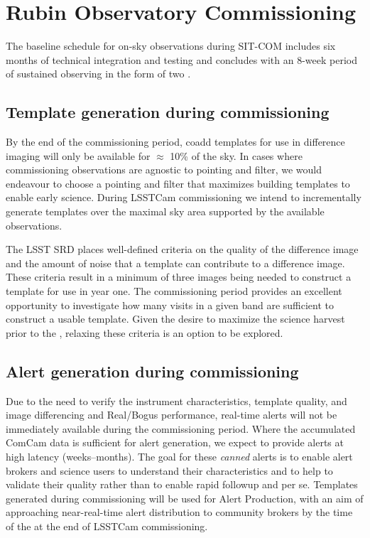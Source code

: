 \section{Rubin Observatory Commissioning} 
\label{sec:commissioning}

The baseline schedule for on-sky observations during SIT-COM includes six months of technical integration and testing and concludes with an 8-week period of sustained observing in the form of two \svs \citep{SCTN-007}. 

\subsection{Template generation during commissioning}

By the end of the commissioning period, coadd templates for use in difference imaging will only be available for $\approx$ 10\% of the sky. 
In cases where commissioning observations are agnostic to pointing and filter, we would endeavour to choose a pointing and filter that maximizes building templates to enable early science. 
During LSSTCam commissioning we intend to incrementally generate templates over the maximal sky area supported by the available observations.

The LSST SRD places well-defined criteria on the quality of the difference image and the amount of noise that a template can contribute to a difference image.  
These criteria result in a minimum of three images being needed to construct a template for use in year one.  
The commissioning period provides an excellent opportunity to investigate how many visits in a given band are sufficient to construct a usable template. 
Given the desire to maximize the science harvest prior to the \drone,  relaxing these criteria is an option to be explored. 

\subsection{Alert generation during commissioning}

Due to the need to verify the instrument characteristics, template quality, and image differencing and Real/Bogus performance, real-time alerts will not be immediately available during the commissioning period. 
Where the accumulated ComCam data is sufficient for alert generation, we expect to provide alerts at high latency (weeks--months). 
The goal for these {\it canned} alerts is to enable alert brokers and science users to understand their characteristics and to help to validate their quality rather than to enable rapid followup and \es per se.
Templates generated during commissioning will be used for Alert Production, with an aim of approaching near-real-time alert distribution to community brokers by the time of the \svs at the end of LSSTCam commissioning. 

